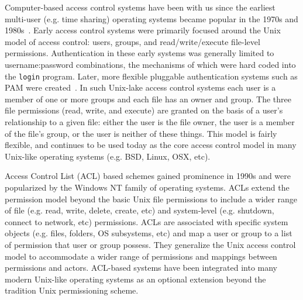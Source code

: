 Computer-based access control systems have been with us since the
earliest multi-user (e.g. time sharing) operating systems became
popular in the 1970s and 1980s~\cite{saltzer1974}. Early access
control systems were primarily focused around the Unix model of access
control: users, groups, and read/write/execute file-level
permissions. Authentication in these early systems was generally
limited to username:password combinations, the mechanisms of which
were hard coded into the \texttt{login} program. Later, more flexible
pluggable authentication systems such as PAM were
created~\cite{samar1996, linux-pam, openpam}. In such Unix-lake access
control systems each user is a member of one or more groups and each
file has an owner and group. The three file permissions (read, write,
and execute) are granted on the basis of a user's relationship to a
given file: either the user is the file owner, the user is a member of
the file's group, or the user is neither of these things. This
model is fairly flexible, and continues to be used today as the core
access control model in many Unix-like operating systems (e.g. BSD,
Linux, OSX, etc).

Access Control List (ACL) based schemes gained prominence in 1990s and
were popularized by the Windows NT family of operating systems. ACLs
extend the permission model beyond the basic Unix file permissions to
include a wider range of file (e.g. read, write, delete, create, etc)
and system-level (e.g. shutdown, connect to network, etc)
permissions. ACLs are associated with specific system objects
(e.g. files, folders, OS subsystems, etc) and map a user or group to a
list of permission that user or group possess. They generalize the
Unix access control model to accommodate a wider range of permissions
and mappings between permissions and actors. ACL-based systems have
been integrated into many modern Unix-like operating systems as an
optional extension beyond the tradition Unix permissioning scheme.

